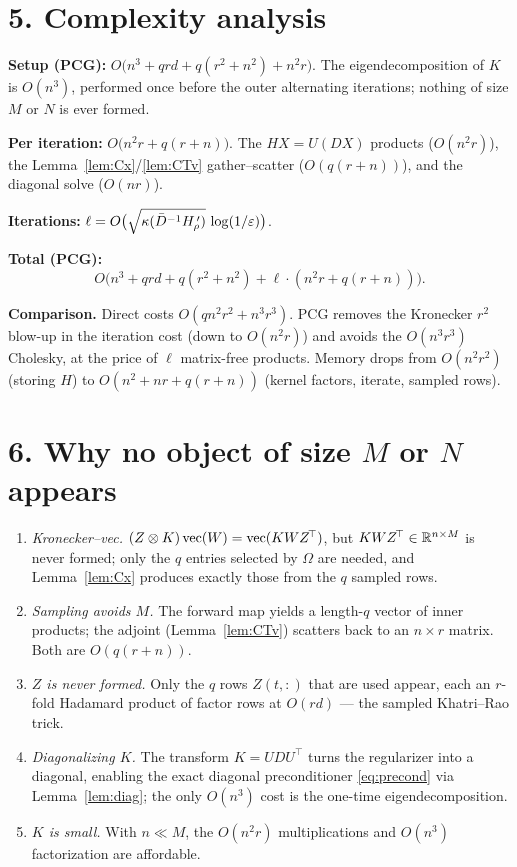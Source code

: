 \documentclass[11pt]{article}
\begin{document}
\section*{5. Complexity analysis}

\textbf{Setup (PCG):}
$O\bigl(n^3 + qrd + q(r^2+n^2) + n^2r\bigr)$. The eigendecomposition of $K$ is
$O(n^3)$, performed once before the outer alternating iterations; nothing of
size $M$ or $N$ is ever formed.

\textbf{Per iteration:} $O\bigl(n^2r + q(r+n)\bigr)$. The $HX=U(DX)$ products
($O(n^2r)$), the Lemma~\ref{lem:Cx}/\ref{lem:CTv} gather--scatter
($O(q(r+n))$), and the diagonal solve ($O(nr)$).

\textbf{Iterations:}
$\ell=O\bigl(\sqrt{\kappa(\bar D^{-1}H_\rho^{\,\prime})}\,\log(1/\varepsilon)\bigr)$.

\textbf{Total (PCG):}
\[
  O\bigl(n^3 + qrd + q(r^2+n^2) + \ell\cdot(n^2r+q(r+n))\bigr).
\]

\textbf{Comparison.} Direct costs $O(qn^2r^2+n^3r^3)$. PCG removes the
Kronecker $r^2$ blow-up in the iteration cost (down to $O(n^2r)$) and avoids
the $O(n^3r^3)$ Cholesky, at the price of $\ell$ matrix-free products. Memory
drops from $O(n^2r^2)$ (storing $H$) to $O(n^2+nr+q(r+n))$ (kernel factors,
iterate, sampled rows).

\section*{6. Why no object of size \texorpdfstring{$M$}{M} or \texorpdfstring{$N$}{N} appears}

\begin{enumerate}\setlength\itemsep{4pt}
\item \emph{Kronecker--vec.} $(Z\otimes K)\operatorname{vec}(W)=\operatorname{vec}(KWZ^{\!\top})$, but
$KWZ^{\!\top}\in\mathbb{R}^{n\times M}$ is never formed; only the $q$ entries selected
by $\Omega$ are needed, and Lemma~\ref{lem:Cx} produces exactly those from the
$q$ sampled rows.
\item \emph{Sampling avoids $M$.} The forward map yields a length-$q$ vector of
inner products; the adjoint (Lemma~\ref{lem:CTv}) scatters back to an
$n\times r$ matrix. Both are $O(q(r+n))$.
\item \emph{$Z$ is never formed.} Only the $q$ rows $\widehat Z(t,:)$ that are
used appear, each an $r$-fold Hadamard product of factor rows at $O(rd)$ — the
sampled Khatri--Rao trick.
\item \emph{Diagonalizing $K$.} The transform $K=UDU^{\!\top}$ turns the
regularizer into a diagonal, enabling the exact diagonal preconditioner
\eqref{eq:precond} via Lemma~\ref{lem:diag}; the only $O(n^3)$ cost is the
one-time eigendecomposition.
\item \emph{$K$ is small.} With $n\ll M$, the $O(n^2r)$ multiplications and
$O(n^3)$ factorization are affordable.
\end{enumerate}
\end{document}
